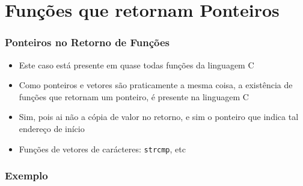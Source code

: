 \section{Funções que retornam Ponteiros}

\begin{frame}[fragile,c]
\frametitle{Ponteiros no  Retorno de Funções}
  \begin{itemize}[<+->]
   \item Este caso está presente em quase todas funções da linguagem C
   \item Como ponteiros e vetores são praticamente a mesma coisa,
   a existência de funções que retornam um ponteiro, é presente na linguagem C
   \item Sim, pois ai não a cópia de valor no retorno, e sim
   o ponteiro que indica tal endereço de início
   \item Funções de vetores de carácteres: \texttt{strcmp}, etc
   

   \end{itemize}
\end{frame}



\begin{frame}[allowframebreaks=0.9, c]
\frametitle{Exemplo}
   


\end{frame}




